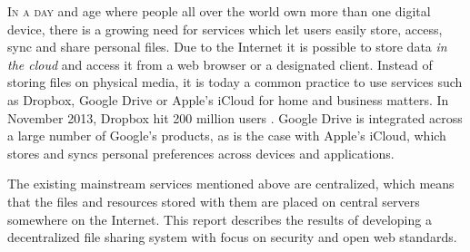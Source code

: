 \lettrine[lines=3]{I}{n a day} and age where people all over the world own more than one digital device, there is a growing need for services which let users easily store, access, sync and share personal files. Due to the Internet it is possible to store data \emph{in the cloud} and access it from a web browser or a designated client. Instead of storing files on physical media, it is today a common practice to use services such as Dropbox, Google Drive or Apple's iCloud for home and business matters. In November 2013, Dropbox hit 200 million users \cite{Constine:2013:Online}. Google Drive is integrated across a large number of Google's products, as is the case with Apple's iCloud, which stores and syncs personal preferences across devices and applications.

The existing mainstream services mentioned above are centralized, which means that the files and resources stored with them are placed on central servers somewhere on the Internet. This report describes the results of developing a decentralized file sharing system with focus on security and open web standards.






